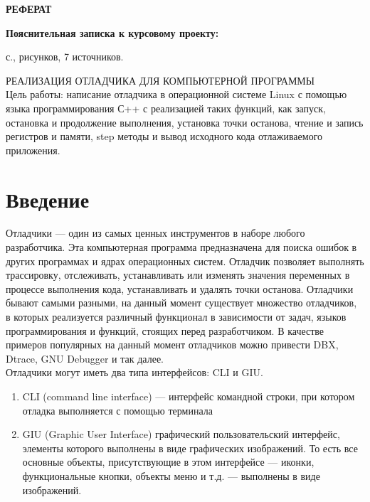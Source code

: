 \documentclass[oneside,final,14pt]{extreport}
\begin{document}
\clearpage
{\bf РЕФЕРАТ}

\vskip12pt
{\bf Пояснительная записка к курсовому проекту: } {
	 \begin{NoHyper}{\pageref{LastPage}}\end{NoHyper} с., 
	  рисунков, 
	 7 источников.
 }

РЕАЛИЗАЦИЯ ОТЛАДЧИКА ДЛЯ КОМПЬЮТЕРНОЙ ПРОГРАММЫ\\

Цель работы: написание отладчика в операционной системе Linux с помощью языка программирования С++ с реализацией таких функций, как запуск, остановка и продолжение выполнения, установка точки останова, чтение и запись регистров и памяти, step методы и вывод исходного кода отлаживаемого приложения.

\newpage
\tableofcontents
\chapter*{Введение}
Отладчики — один из самых ценных инструментов в наборе любого разработчика. Эта компьютерная программа предназначена для поиска ошибок в других программах и ядрах операционных систем. Отладчик позволяет выполнять трассировку, отслеживать, устанавливать или изменять значения переменных в процессе выполнения кода, устанавливать и удалять точки останова.
Отладчики бывают самыми разными, на данный момент существует множество отладчиков, в которых реализуется различный функционал в зависимости от задач, языков программирования и функций, стоящих перед разработчиком. В качестве примеров популярных на данный момент отладчиков можно привести DBX, Dtrace, GNU Debugger и так далее.\\

Отладчики могут иметь два типа интерфейсов: CLI и GIU.
\begin{enumerate}
	\item CLI (command line interface) — интерфейс командной строки, при котором отладка выполняется с помощью терминала
	\item GIU (Graphic User Interface) графический пользовательский интерфейс, элементы которого выполнены в виде графических изображений. То есть все основные объекты, присутствующие в этом интерфейсе — иконки, функциональные кнопки, объекты меню и т.д. — выполнены в виде изображений.
\end{enumerate}
\end{document}
